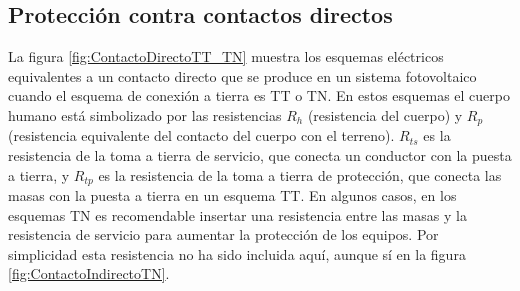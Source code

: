 \subsection{Protección contra contactos directos}

La figura \ref{fig:ContactoDirectoTT_TN} muestra los esquemas eléctricos
equivalentes a un contacto directo que se produce en un sistema fotovoltaico
cuando el esquema de conexión a tierra es TT o TN. En estos esquemas
el cuerpo humano está simbolizado por las resistencias $R_{h}$
(resistencia del cuerpo) y $R_{p}$
(resistencia equivalente del contacto del cuerpo con el terreno).
$R_{ts}$
es la resistencia de la toma a tierra de servicio, que conecta un
conductor con la puesta a tierra, y $R_{tp}$
es la resistencia de la toma a tierra de protección, que conecta las
masas con la puesta a tierra en un esquema TT. En algunos casos, en
los esquemas TN es recomendable insertar una resistencia entre las
masas y la resistencia de servicio para aumentar la protección de
los equipos. Por simplicidad esta resistencia no ha sido incluida
aquí, aunque sí en la figura \ref{fig:ContactoIndirectoTN}.

